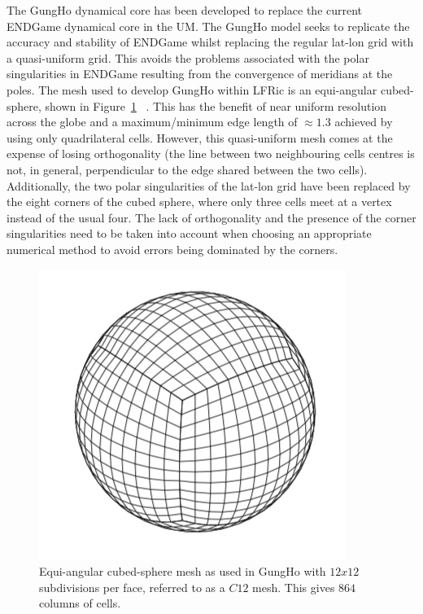\documentclass[review,times]{elsarticle}
\begin{document}
The GungHo dynamical core has been developed to replace the current ENDGame
dynamical core in the UM. The GungHo model seeks to replicate the
accuracy and stability of ENDGame whilst replacing the regular lat-lon
grid with a quasi-uniform grid. This avoids the problems associated
with the polar singularities in ENDGame resulting from the
convergence of meridians at the poles. The mesh used to develop GungHo
within LFRic is an equi-angular cubed-sphere, shown in Figure~\ref{fig:cubed-sphere}
~\cite{doi:10.1175/MWR2890.1}. This has the benefit of near uniform 
resolution across the globe and a maximum/minimum edge length of
$\approx 1.3$ achieved by using only quadrilateral cells.  However,
this quasi-uniform mesh comes at the expense of losing orthogonality
(the line between two neighbouring cells centres is not, in general,
perpendicular to the edge shared between the two cells). Additionally,
the two polar singularities of the lat-lon grid have been replaced by
the eight corners of the cubed sphere, where only three cells meet at a
vertex instead of the usual four. The lack of orthogonality and the
presence of the corner singularities need to be taken into account when
choosing an appropriate numerical method to avoid errors being dominated
by the corners.
%
\begin{figure}
\centering\includegraphics[width=0.6\linewidth]{Fig1_Cubed_Sphere.png}
\caption{\label{fig:cubed-sphere} Equi-angular cubed-sphere mesh as
used in GungHo with $12x12$ subdivisions per face, 
referred to as a $C12$ mesh. This gives $864$ columns of cells.}
\end{figure}
%
\end{document}
